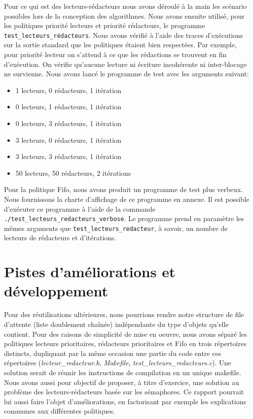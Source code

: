 \documentclass[11pt]{article}
\theoremstyle{definition}
\theoremstyle{definition}
\begin{document}
Pour ce qui est des lecteurs-rédacteurs nous avons déroulé à la main les scénario possibles lors de la conception des algorithmes. Nous avons ensuite utilisé, pour les politiques priorité lecteurs et priorité rédacteurs, le programme \texttt{test\_lecteurs\_rédacteurs}. Nous avons vérifié à l'aide des traces d'exécutions sur la sortie standard que les politiques étaient bien respectées. Par exemple, pour priorité lecteur on s'attend à ce que les rédactions se trouvent en fin d'exécution. On vérifie qu'aucune lecture ni écriture incohérente ni inter-blocage ne survienne. Nous avons lancé le programme de test avec les arguments suivant:
\begin{itemize}
\item 1 lecteurs, 0 rédacteurs, 1 itération
\item 0 lecteurs, 1 rédacteurs, 1 itération
\item 0 lecteurs, 3 rédacteurs, 1 itération
\item 3 lecteurs, 0 rédacteurs, 1 itération
\item 3 lecteurs, 3 rédacteurs, 1 itération
\item 50 lecteurs, 50 rédacteurs, 2 itérations
\end{itemize}

Pour la politique Fifo, nous avons produit un programme de test plus verbeux.
Nous fournissons la charte d'affichage de ce programme en annexe.
Il est possible d'exécuter ce programme à l'aide de la commande \texttt{./test\_lecteurs\_redacteurs\_verbose}. Le programme prend en paramètre les mêmes arguments que \texttt{test\_lecteurs\_redacteur}, à savoir, un nombre de lecteurs de rédacteurs et d'itérations.

\section{Pistes d'améliorations et développement}
Pour des réutilisations ultérieures, nous pourrions rendre notre structure de file d'attente (liste doublement chaînée) indépendante du type d'objets qu'elle contient. Pour des raisons de simplicité de mise en oeuvre, nous avons séparé les politiques lecteurs prioritaires, rédacteurs prioritaires et Fifo en trois répertoires distincts, dupliquant par la même occasion une partie du code entre ces répertoires (\textit{lecteur\_redacteur.h}, \textit{Makefile}, \textit{test\_lecteurs\_redacteurs.c}). Une solution serait de réunir les instructions de compilation en un unique makefile. Nous avons aussi pour objectif de proposer, à titre d'exercice, une solution au problème des lecteurs-rédacteurs basée sur les sémaphores. Ce rapport pourrait lui aussi faire l'objet d'améliorations, en factorisant par exemple les explications communes aux différentes politiques.
 
\end{document}
